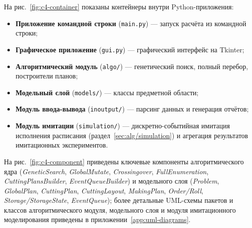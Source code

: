 На рис.~\ref{fig:c4-container} показаны контейнеры внутри Python-приложения:
\begin{itemize}
    \item \textbf{Приложение командной строки} (\texttt{main.py}) --- запуск расчёта из командной строки;
    \item \textbf{Графическое приложение} (\texttt{gui.py}) --- графический интерфейс на Tkinter;
    \item \textbf{Алгоритмический модуль} (\texttt{algo/}) --- генетический поиск, полный перебор, построители планов;
    \item \textbf{Модельный слой} (\texttt{models/}) --- классы предметной области;
    \item \textbf{Модуль ввода-вывода} (\texttt{inoutput/}) --- парсинг данных и генерация отчётов;
    \item \textbf{Модуль имитации} (\texttt{simulation/}) --- дискретно-событийная имитация исполнения расписания (раздел~\ref{sec:alg/simulation}) и агрегация результатов имитационных экспериментов.
\end{itemize}

На рис.~\ref{fig:c4-component} приведены ключевые компоненты алгоритмического ядра (\textit{GeneticSearch}, \textit{GlobalMutate}, \textit{Crossingover}, \textit{FullEnumeration}, \textit{CuttingPlansBuilder}, \textit{EventQueueBuilder}) и модельного слоя (\textit{Problem}, \textit{GlobalPlan}, \textit{CuttingPlan}, \textit{CuttingLayout}, \textit{MakingPlan}, \textit{Order/Roll}, \textit{Storage/StorageState}, \textit{EventQueue}); более детальные UML-схемы пакетов и классов алгоритмического модуля, модельного слоя и модуля имитационного моделирования приведены в приложении~\ref{app:uml-diagrams}.
 
